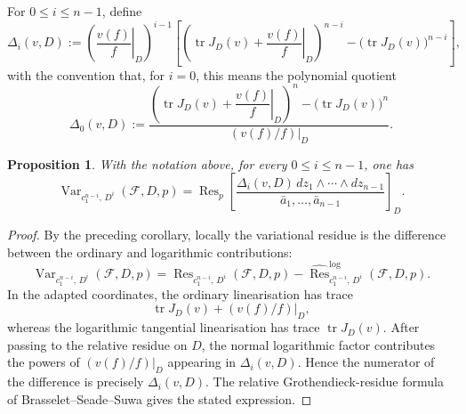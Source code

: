\documentclass[12pt,reqno,a4paper]{amsart}
\numberwithin{equation}{section}
\theoremstyle{plain}
\newtheorem{proposition}[proposition]{Proposition}
\theoremstyle{definition}
\DeclareMathOperator{\Var}{Var}
\newcommand{\cF}{\mathcal{F}}
\begin{document}
For \(0\leq i\leq n-1\), define
\[
\Delta_i(v,D)
:=
\left(\left.\frac{v(f)}{f}\right|_D\right)^{i-1}
\left[
\left(
\operatorname{tr}J_D(v)
+
\left.\frac{v(f)}{f}\right|_D
\right)^{n-i}
-
\bigl(\operatorname{tr}J_D(v)\bigr)^{n-i}
\right],
\]
with the convention that, for \(i=0\), this means the polynomial quotient
\[
\Delta_0(v,D)
:=
\frac{
\left(
\operatorname{tr}J_D(v)
+
\left.\dfrac{v(f)}{f}\right|_D
\right)^n
-
\bigl(\operatorname{tr}J_D(v)\bigr)^n
}
{ \left.(v(f)/f)\right|_D}.
\]

\begin{proposition} 
\label{prop:var-groth}
With the notation above, for every \(0\leq i\leq n-1\), one has
\[
\Var_{c_1^{n-i},\,D^i}(\cF,D,p)
=
\operatorname{Res}_{p}
\left[
\frac{
\Delta_i(v,D)\,
dz_1\wedge\cdots\wedge dz_{n-1}
}
{\bar a_1,\ldots,\bar a_{n-1}}
\right]_{D}.
\]
\end{proposition}

\begin{proof}
By the preceding corollary, locally the variational residue is the difference
between the ordinary and logarithmic contributions:
\[
\Var_{c_1^{n-i},\,D^i}(\cF,D,p)
=
\operatorname{Res}_{c_1^{n-i},\,D^i}(\cF,D,p)
-
\widehat{\operatorname{Res}}^{\log}_{c_1^{n-i},\,D^i}(\cF,D,p).
\]
In the adapted coordinates, the ordinary linearisation has trace
\[
\operatorname{tr}J_D(v)+ \left.(v(f)/f)\right|_D,
\]
whereas the logarithmic tangential linearisation has trace
$
\operatorname{tr}J_D(v).$
After passing to the relative residue on \(D\), the normal logarithmic factor
contributes the powers of \(\left.(v(f)/f)\right|_D\) appearing in
\(\Delta_i(v,D)\). Hence the numerator of the difference is precisely
\(\Delta_i(v,D)\). The relative Grothendieck-residue formula of
Brasselet--Seade--Suwa \cite[\S 6.3]{BrSeSu} gives the stated expression.
\end{proof}


 
\end{document}
